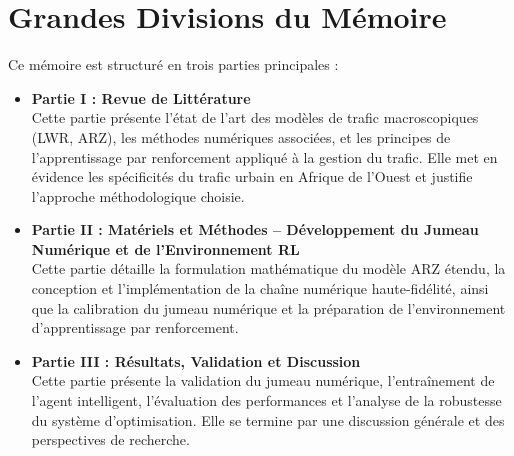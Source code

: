 \section{Grandes Divisions du Mémoire}
\label{sec:divisions_memoire}

Ce mémoire est structuré en trois parties principales :

\begin{itemize}
    \item \textbf{Partie I : Revue de Littérature} \\
          Cette partie présente l'état de l'art des modèles de trafic macroscopiques (LWR, ARZ), les méthodes numériques associées, et les principes de l'apprentissage par renforcement appliqué à la gestion du trafic. Elle met en évidence les spécificités du trafic urbain en Afrique de l'Ouest et justifie l'approche méthodologique choisie.

    \item \textbf{Partie II : Matériels et Méthodes – Développement du Jumeau Numérique et de l'Environnement RL} \\
          Cette partie détaille la formulation mathématique du modèle ARZ étendu, la conception et l'implémentation de la chaîne numérique haute-fidélité, ainsi que la calibration du jumeau numérique et la préparation de l'environnement d'apprentissage par renforcement.

    \item \textbf{Partie III : Résultats, Validation et Discussion} \\
          Cette partie présente la validation du jumeau numérique, l'entraînement de l'agent intelligent, l'évaluation des performances et l'analyse de la robustesse du système d'optimisation. Elle se termine par une discussion générale et des perspectives de recherche.
\end{itemize}



